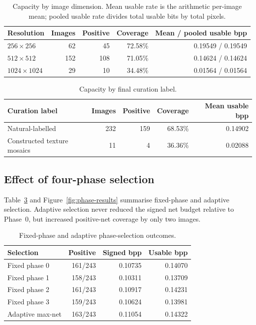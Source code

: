 \documentclass[preprint,12pt,a4paper]{elsarticle}
\begin{document}
\begin{table}[t]
\centering
\caption{Capacity by image dimension. Mean usable rate is the arithmetic per-image mean; pooled usable rate divides total usable bits by total pixels.}
\label{tab:resolution}
\small
\begin{tabular}{lrrrr}
\toprule
Resolution & Images & Positive & Coverage & Mean / pooled usable bpp\\
\midrule
$256\times256$ & 62 & 45 & 72.58\% & 0.19549 / 0.19549\\
$512\times512$ & 152 & 108 & 71.05\% & 0.14624 / 0.14624\\
$1024\times1024$ & 29 & 10 & 34.48\% & 0.01564 / 0.01564\\
\bottomrule
\end{tabular}
\end{table}

\begin{table}[t]
\centering
\caption{Capacity by final curation label.}
\label{tab:classification}
\small
\begin{tabular}{lrrrr}
\toprule
Curation label & Images & Positive & Coverage & Mean usable bpp\\
\midrule
Natural-labelled & 232 & 159 & 68.53\% & 0.14902\\
Constructed texture mosaics & 11 & 4 & 36.36\% & 0.02088\\
\bottomrule
\end{tabular}
\end{table}

\subsection{Effect of four-phase selection}

Table~\ref{tab:phases} and Figure~\ref{fig:phase-results} summarise fixed-phase and adaptive selection. Adaptive selection never reduced the signed net budget relative to Phase~0, but increased positive-net coverage by only two images.

\begin{table}[t]
\centering
\caption{Fixed-phase and adaptive phase-selection outcomes.}
\label{tab:phases}
\small
\begin{tabularx}{\textwidth}{Xrrr}
\toprule
Selection & Positive & Signed bpp & Usable bpp\\
\midrule
Fixed phase 0 & 161/243 & 0.10735 & 0.14070\\
Fixed phase 1 & 158/243 & 0.10311 & 0.13709\\
Fixed phase 2 & 161/243 & 0.10917 & 0.14231\\
Fixed phase 3 & 159/243 & 0.10624 & 0.13981\\
Adaptive max-net & 163/243 & 0.11054 & 0.14322\\
\bottomrule
\end{tabularx}
\end{table}
\end{document}
